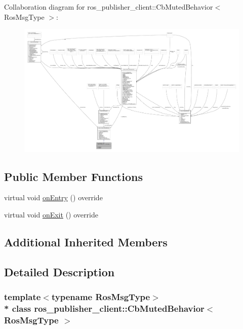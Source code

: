 Collaboration diagram for ros\+\_\+publisher\+\_\+client\+:\+:Cb\+Muted\+Behavior$<$ Ros\+Msg\+Type $>$\+:
\nopagebreak
\begin{figure}[H]
\begin{center}
\leavevmode
\includegraphics[width=350pt]{classros__publisher__client_1_1CbMutedBehavior__coll__graph}
\end{center}
\end{figure}
\subsection*{Public Member Functions}
\begin{DoxyCompactItemize}
\item 
virtual void \hyperlink{classros__publisher__client_1_1CbMutedBehavior_a080b2db7ff4aa25463423e4b0a8ee572}{on\+Entry} () override
\item 
virtual void \hyperlink{classros__publisher__client_1_1CbMutedBehavior_aad2c833afdc6f5d81f3ddce3c0f767e3}{on\+Exit} () override
\end{DoxyCompactItemize}
\subsection*{Additional Inherited Members}


\subsection{Detailed Description}
\subsubsection*{template$<$typename Ros\+Msg\+Type$>$\\*
class ros\+\_\+publisher\+\_\+client\+::\+Cb\+Muted\+Behavior$<$ Ros\+Msg\+Type $>$}



